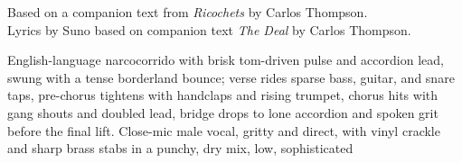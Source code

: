 

\begin{notes}
Based on a companion text from \emph{Ricochets} by Carlos Thompson.\\
Lyrics by Suno based on companion text \emph{The Deal} by Carlos Thompson.
\end{notes}

\begin{style}
English-language narcocorrido with brisk tom-driven pulse and accordion lead, swung with a tense borderland bounce; verse rides sparse bass, guitar, and snare taps, pre-chorus tightens with handclaps and rising trumpet, chorus hits with gang shouts and doubled lead, bridge drops to lone accordion and spoken grit before the final lift. %
Close-mic male vocal, gritty and direct, with vinyl crackle and sharp brass stabs in a punchy, dry mix, low, sophisticated
\end{style}


